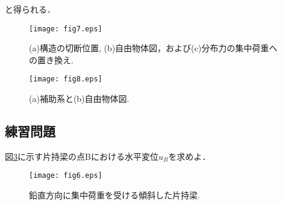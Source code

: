 ﻿\documentclass[10pt,a4j]{jarticle}
\begin{document}
と得られる．
\begin{figure}[h]
	\begin{center}
	\texttt{[image: fig7.eps]} 
	\end{center}
	\caption{(a)構造の切断位置, (b)自由物体図，および(c)分布力の集中荷重への置き換え.} 
	\label{fig:fig7}
\end{figure}
\begin{figure}[h]
	\begin{center}
	\texttt{[image: fig8.eps]} 
	\end{center}
	\caption{(a)補助系と(b)自由物体図.} 
	\label{fig:fig8}
\end{figure}
\subsection{練習問題}
図\ref{fig:fig6}に示す片持梁の点Bにおける水平変位$u_B$を求めよ．
\begin{figure}[h]
	\begin{center}
	\texttt{[image: fig6.eps]} 
	\end{center}
	\caption{鉛直方向に集中荷重を受ける傾斜した片持梁.} 
	\label{fig:fig6}
\end{figure}
\end{document}
